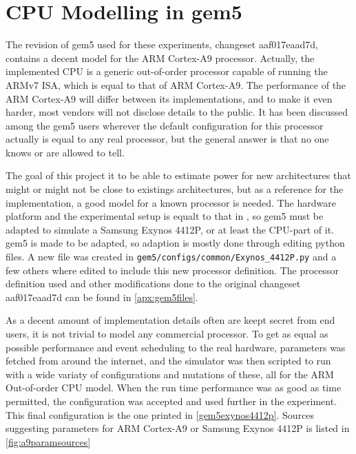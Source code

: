 \section{CPU Modelling in gem5}

The revision of gem5 used for these experiments, changeset aaf017eaad7d,
contains a decent model for the ARM Cortex-A9 processor. Actually, the
implemented CPU is a generic out-of-order processor capable of running the ARMv7
ISA, which is equal to that of ARM Cortex-A9\cite{armtech}. The performance of
the ARM Cortex-A9 will differ between its implementations, and to make it even
harder, most vendors will not disclose details to the public. It has been
discussed among the gem5 users wherever the default configuration for this
processor actually is equal to any real processor\cite{a15maillist}, but the
general answer is that no one knows or are allowed to tell.

The goal of this project it to be able to estimate power for new architectures
that might or might not be close to existings architectures, but as a reference
for the implementation, a good model for a known processor is needed. The
hardware platform and the experimental setup is equalt to that in
\cite{rundehvatum2013exploring}, so gem5 must be adapted to simulate a Samsung
Exynos 4412P, or at least the CPU-part of it.  gem5 is made to be adapted, so
adaption is mostly done through editing python files. A new file was created in
\texttt{gem5/configs/common/Exynos\_4412P.py} and a few others where edited to
include this new processor definition. The processor definition used and other
modifications done to the original changeset aaf017eaad7d can be found in
\autoref{apx:gem5files}.

As a decent amount of implementation details often are keept secret from end users, it
is not trivial to model any commercial processor. To get as equal as possible performance
and event scheduling to the real hardware, parameters was fetched from around the internet,
and the simulator was then scripted to run with a wide variaty of configurations and
mutations of these, all for the ARM Out-of-order CPU model. When the run time performance was
as good as time permitted, the configuration was accepted and used further in the experiment.
This final configuration is the one printed in \autoref{gem5exynos4412p}. Sources suggesting
parameters for ARM Cortex-A9 or Samsung Exynos 4412P is listed in \autoref{fig:a9paramsources}

